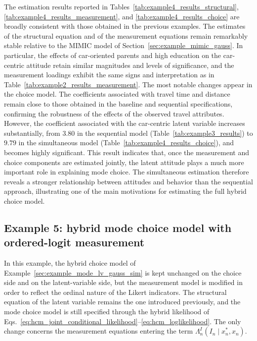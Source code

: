 \documentclass[12pt,a4paper]{article}
\begin{document}
The estimation results reported in
Tables~\ref{tab:example4_results_structural},
\ref{tab:example4_results_measurement}, and
\ref{tab:example4_results_choice} are broadly consistent with those
obtained in the previous examples. The estimates of the structural
equation and of the measurement equations remain remarkably stable
relative to the MIMIC model of
Section~\ref{sec:example_mimic_gauss}. In particular, the effects of
car-oriented parents and high education on the car-centric attitude
retain similar magnitudes and levels of significance, and the
measurement loadings exhibit the same signs and interpretation as in
Table~\ref{tab:example2_results_measurement}. The most notable changes
appear in the choice model. The coefficients associated with travel
time and distance remain close to those obtained in the baseline and
sequential specifications, confirming the robustness of the effects of
the observed travel attributes. However, the coefficient associated
with the car-centric latent variable increases substantially, from
\(3.80\) in the sequential model
(Table~\ref{tab:example3_results}) to \(9.79\) in the simultaneous
model (Table~\ref{tab:example4_results_choice}), and becomes highly
significant. This result indicates that, once the measurement and
choice components are estimated jointly, the latent attitude plays a
much more important role in explaining mode choice. The simultaneous
estimation therefore reveals a stronger relationship between attitudes
and behavior than the sequential approach, illustrating one of the
main motivations for estimating the full hybrid choice model.

\FloatBarrier

\subsection{Example 5: hybrid mode choice model with ordered-logit measurement}
\label{sec:example_mode_lv_ordlogit_sim}

In this example, the hybrid choice model of
Example~\ref{sec:example_mode_lv_gauss_sim} is kept unchanged on the
choice side and on the latent-variable side, but the measurement model
is modified in order to reflect the ordinal nature of the Likert
indicators. The structural equation of the latent variable remains the
one introduced previously, and the mode choice model is still
specified through the hybrid likelihood of
Eqs.~\eqref{eq:hcm_joint_conditional_likelihood}--\eqref{eq:hcm_loglikelihood}.
The only change concerns the measurement equations entering the term
\(\Lambda_n^I(I_n \mid x_n^*,x_n)\).
\end{document}
